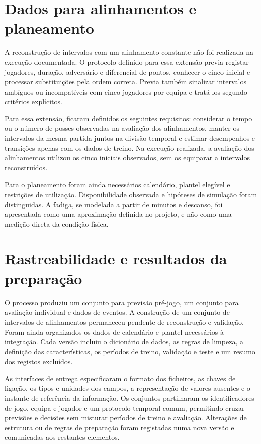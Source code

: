\section{Dados para alinhamentos e planeamento}

A reconstrução de intervalos com um alinhamento constante não foi
realizada na execução documentada. O protocolo definido para essa extensão
previa registar jogadores, duração, adversário e diferencial de pontos,
conhecer o cinco inicial e processar substituições pela ordem correta.
Previa também sinalizar intervalos ambíguos ou incompatíveis com cinco
jogadores por equipa e tratá-los segundo critérios explícitos.

Para essa extensão, ficaram definidos os seguintes requisitos: considerar
o tempo ou o número de posses observadas na avaliação dos alinhamentos,
manter os intervalos da mesma partida juntos na divisão temporal e
estimar desempenhos e transições apenas com os dados de treino.
Na execução realizada, a avaliação dos alinhamentos utilizou os cinco
iniciais observados, sem os equiparar a intervalos reconstruídos.

Para o planeamento foram ainda necessários calendário, plantel elegível
e restrições de utilização. Disponibilidade observada e hipóteses de
simulação foram distinguidas. A fadiga, se modelada a partir de minutos
e descanso, foi apresentada como uma aproximação definida no projeto,
e não como uma medição direta da condição física.

\section{Rastreabilidade e resultados da preparação}

O processo produziu um conjunto para previsão pré-jogo, um conjunto para
avaliação individual e dados de eventos. A construção de um conjunto de
intervalos de alinhamentos permaneceu pendente de reconstrução e validação. Foram ainda
organizados os dados de calendário e plantel necessários à integração. Cada versão incluiu o dicionário de dados, as regras de
limpeza, a definição das características, os períodos de treino,
validação e teste e um resumo dos registos excluídos.

As interfaces de entrega especificaram o formato dos ficheiros, as chaves
de ligação, os tipos e unidades dos campos, a representação de valores
ausentes e o instante de referência da informação. Os conjuntos partilharam
os identificadores de jogo, equipa e jogador e um protocolo temporal
comum, permitindo cruzar previsões e decisões sem misturar períodos de
treino e avaliação. Alterações de estrutura ou de regras de preparação
foram registadas numa nova versão e comunicadas aos restantes elementos.

